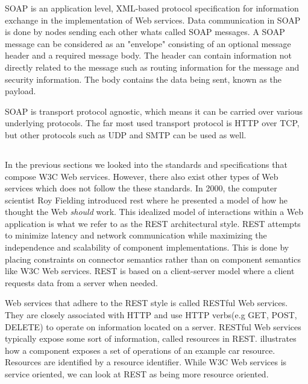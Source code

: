SOAP is an application level, XML-based protocol specification for information
exchange\cite{w3c-soap} in the implementation of Web services. Data
communication in SOAP is done by nodes sending each other whats called SOAP
messages. A SOAP message can be considered as an "envelope" consisting of an
optional message header and a required message body. The header can contain
information not directly related to the message such as routing information for
the message and security information. The body contains the data being sent,
known as the payload.

SOAP is transport protocol agnostic, which means it can be carried over various
underlying protocols. The far most used transport protocol is HTTP over TCP, but
other protocols such as UDP and SMTP can be used as well.

\subsection{}
\label{rest}

In the previous sections we looked into the standards and specifications that
compose W3C Web services. However, there also exist other types of Web services
which does not follow the these standards. In 2000, the computer scientist Roy
Fielding introduced \gls{rest} where he presented a model of how he thought the
Web \textit{should} work. This idealized model of interactions within a Web
application\cite{rest-fielding} is what we refer to as the REST architectural
style. REST attempts to minimize latency and network communication while
maximizing the independence and scalability of component implementations. This
is done by placing constraints on connector semantics rather than on component
semantics like W3C Web services.  REST is based on a client-server model where a
client requests data from a server when needed.

Web services that adhere to the REST style is called RESTful Web services. They
are closely associated with HTTP and use HTTP verbs(e.g GET, POST, DELETE) to
operate on information located on a server. RESTful Web services typically
expose some sort of information, called resources in REST. 
illustrates how a component exposes a set of operations of an example car
resource. Resources are identified by a resource identifier. While W3C Web
services is service oriented, we can look at REST as being more resource
oriented.

